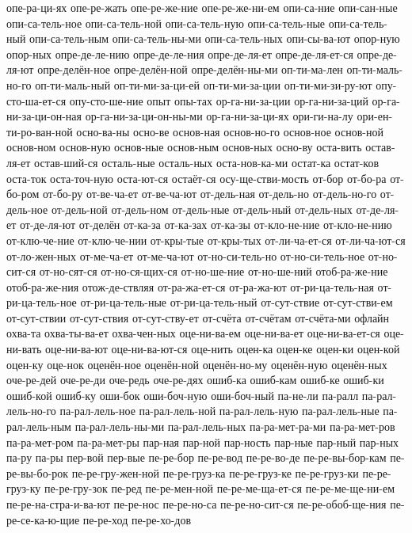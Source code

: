 {опе-ра-ци-ях
опе-ре-жать
опе-ре-же-ние
опе-ре-же-ни-ем
опи-са-ние
опи-сан-ные
опи-са-тель-ное
опи-са-тель-ной
опи-са-тель-ную
опи-са-тель-ные
опи-са-тель-ный
опи-са-тель-ным
опи-са-тель-ны-ми
опи-са-тель-ных
опи-сы-ва-ют
опор-ную
опор-ных
опре-де-ле-нию
опре-де-ле-ния
опре-де-ля-ет
опре-де-ля-ет-ся
опре-де-ля-ют
опре-делён-ное
опре-делён-ной
опре-делён-ны-ми
оп-ти-ма-лен
оп-ти-маль-но-го
оп-ти-маль-ный
оп-ти-ми-за-ци-ей
оп-ти-ми-за-ции
оп-ти-ми-зи-ру-ют
опу-сто-ша-ет-ся
опу-сто-ше-ние
опыт
опы-тах
ор-га-ни-за-ции
ор-га-ни-за-ций
ор-га-ни-за-ци-он-ная
ор-га-ни-за-ци-он-ны-ми
ор-га-ни-за-ци-ях
ори-ги-на-лу
ори-ен-ти-ро-ван-ной
осно-ва-ны
осно-ве
основ-ная
основ-но-го
основ-ное
основ-ной
основ-ном
основ-ную
основ-ные
основ-ным
основ-ных
осно-ву
оста-вить
остав-ля-ет
остав-ший-ся
осталь-ные
осталь-ных
оста-нов-ка-ми
остат-ка
остат-ков
оста-ток
оста-точ-ную
оста-ют-ся
остаёт-ся
осу-ще-стви-мость
от-бор
от-бо-ра
от-бо-ром
от-бо-ру
от-ве-ча-ет
от-ве-ча-ют
от-дель-ная
от-дель-но
от-дель-но-го
от-дель-ное
от-дель-ной
от-дель-ном
от-дель-ные
от-дель-ный
от-дель-ных
от-де-ля-ет
от-де-ля-ют
от-делён
от-ка-за
от-ка-зах
от-ка-зы
от-кло-не-ние
от-кло-не-нию
от-клю-че-ние
от-клю-че-нии
от-кры-тые
от-кры-тых
от-ли-ча-ет-ся
от-ли-ча-ют-ся
от-ло-жен-ных
от-ме-ча-ет
от-ме-ча-ют
от-но-си-тель-но
от-но-си-тель-ное
от-но-сит-ся
от-но-сят-ся
от-но-ся-щих-ся
от-но-ше-ние
от-но-ше-ний
отоб-ра-же-ние
отоб-ра-же-ния
отож-де-ствляя
от-ра-жа-ет-ся
от-ра-жа-ют
от-ри-ца-тель-ная
от-ри-ца-тель-ное
от-ри-ца-тель-ные
от-ри-ца-тель-ный
от-сут-ствие
от-сут-стви-ем
от-сут-ствии
от-сут-ствия
от-сут-ству-ет
от-счёта
от-счётам
от-счёта-ми
офлайн
охва-та
охва-ты-ва-ет
охва-чен-ных
оце-ни-ва-ем
оце-ни-ва-ет
оце-ни-ва-ет-ся
оце-ни-вать
оце-ни-ва-ют
оце-ни-ва-ют-ся
оце-нить
оцен-ка
оцен-ке
оцен-ки
оцен-кой
оцен-ку
оце-нок
оценён-ное
оценён-ной
оценён-но-му
оценён-ную
оценён-ных
оче-ре-дей
оче-ре-ди
оче-редь
оче-ре-дях
ошиб-ка
ошиб-кам
ошиб-ке
ошиб-ки
ошиб-кой
ошиб-ку
оши-бок
оши-боч-ную
оши-боч-ный
па-не-ли
па-ралл
па-рал-лель-но-го
па-рал-лель-ное
па-рал-лель-ной
па-рал-лель-ную
па-рал-лель-ные
па-рал-лель-ным
па-рал-лель-ны-ми
па-рал-лель-ных
па-ра-мет-ра-ми
па-ра-мет-ров
па-ра-мет-ром
па-ра-мет-ры
пар-ная
пар-ной
пар-ность
пар-ные
пар-ный
пар-ных
па-ру
па-ры
пер-вой
пер-вые
пе-ре-бор
пе-ре-вод
пе-ре-во-де
пе-ре-вы-бор-кам
пе-ре-вы-бо-рок
пе-ре-гру-жен-ной
пе-ре-груз-ка
пе-ре-груз-ке
пе-ре-груз-ки
пе-ре-груз-ку
пе-ре-гру-зок
пе-ред
пе-ре-мен-ной
пе-ре-ме-ща-ет-ся
пе-ре-ме-ще-ни-ем
пе-ре-на-стра-и-ва-ют
пе-ре-нос
пе-ре-но-са
пе-ре-но-сит-ся
пе-ре-обоб-ще-ния
пе-ре-се-ка-ю-щие
пе-ре-ход
пе-ре-хо-дов
}
